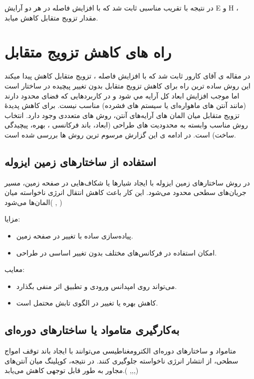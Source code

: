 در نتیجه با تقریب مناسبی ثابت شد که با افزایش فاصله در هر دو آرایش E و H ، مقدار تزویج متقابل کاهش میابد.

\section{راه های کاهش تزویج متقابل}
 در مقاله ی آقای کارور ثابت شد که با افزایش فاصله ، تزویج متقابل کاهش پیدا میکند این روش ساده ترین راه برای کاهش تزویج متقابل بدون تغییر پیچیده در ساختار است اما موجب افزایش ابعاد کل  آرایه  مي شود و در کاربردهایی که فضای محدود دارند (مانند آنتن های ماهوارەای یا سیستم های
  فشرده) مناسب نیست. 
برای کاهش پدیدۀ تزویج متقابل میان المان های آرایەهای آنتن، روش های متعددی وجود دارد. انتخاب روش مناسب وابسته به محدودیت های طراحی (ابعاد، باند فرکانسی ، بهره، پیچیدگی ساخت) است. در ادامه ی این گزارش مرسوم ترین روش ها بررسی شده است.

\subsection{	استفاده از ساختارهای زمین ایزوله}
	در  روش  ساختارهای زمین ایزوله
	 با ایجاد شیارها یا شکاف‌هایی در صفحه زمین، مسیر جریان‌های سطحی محدود می‌شود. این کار باعث کاهش انتقال انرژی ناخواسته میان المان‌ها می‌شود(
	\cite{alibakhshikenari2018antenna}, \cite{emadeddin2017high})
	
	
			مزایا:
	\begin{itemize}
		\item{
	پیاده‌سازی ساده با تغییر در صفحه زمین.
		}
		\item{
امکان استفاده در فرکانس‌های مختلف بدون تغییر اساسی در طراحی.
		}
	\end{itemize}


معایب:
\begin{itemize}
	\item{
	می‌تواند روی امپدانس ورودی و تطبیق اثر منفی بگذارد.
	}
	\item{
	کاهش بهره یا تغییر در الگوی تابش محتمل است.
	}
\end{itemize}


\subsection{
	به‌کارگیری متامواد یا ساختارهای دوره‌ای
}
		متامواد و ساختارهای دوره‌ای الکترومغناطیسی
	 می‌توانند با ایجاد باند توقف امواج سطحی، از انتشار انرژی ناخواسته جلوگیری کنند. در نتیجه، کوپلینگ میان آنتن‌های مجاور به طور قابل توجهی کاهش می‌یابد.(
	\cite{ledimo2022design},\cite{yang2003microstrip},\cite{rahim2008electromagnetic},\cite{tang2020metasurface})
	
